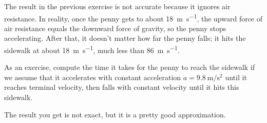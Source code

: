 \documentclass[main.tex]{subfiles}
\begin{document}
\begin{ex}
The result in the previous exercise is not accurate because it ignores air resistance.  In reality, once the penny gets to about \SI{18}{\meter\per\second}, the upward force of air resistance equals the downward force of gravity, so the penny stops accelerating.  After that, it doesn't matter how far the penny falls; it hits the sidewalk at about \SI{18}{\meter\per\second}, much less than \SI{86}{\meter\per\second}.

As an exercise, compute the time it takes for the penny to reach the sidewalk if we assume that it accelerates with constant acceleration
$a = \SI{9.8}{\meter\per\second\squared}$ until it reaches terminal velocity, then falls with constant velocity until it hits this sidewalk.

The result you get is not exact, but it is a pretty good approximation.

\end{ex}


\end{document}
